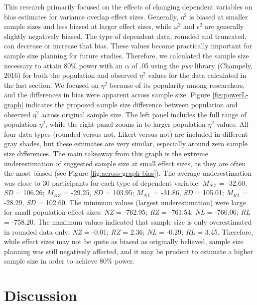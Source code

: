\documentclass[english,man]{apa6}
\theoremstyle{definition}
\theoremstyle{definition}
\theoremstyle{definition}
\theoremstyle{remark}
\begin{document}
This research primarily focused on the effects of changing dependent
variables on bias estimates for variance overlap effect sizes.
Generally, \(\eta^2\) is biased at smaller sample sizes and less biased
at larger effect sizes, while \(\omega^2\) and \(\epsilon^2\) are
generally slightly negatively biased. The type of dependent data,
rounded and truncated, can decrease or increase that bias. These values
become practically important for sample size planning for future
studies. Therefore, we calculated the sample size necessary to attain
80\% power with an \(\alpha\) of .05 using the \emph{pwr} library
(Champely, 2016) for both the population and observed \(\eta^2\) values
for the data calculated in the last section. We focused on \(\eta^2\)
because of its popularity among researchers, and the differences in bias
were apparent across sample size. Figure \ref{fig:powerL-graph}
indicates the proposed sample size difference between population and
observed \(\eta^2\) across original sample size. The left panel includes
the full range of population \(\eta^2\), while the right panel zooms in
to larger population \(\eta^2\) values. All four data types (rounded
versus not, Likert versus not) are included in different gray shades,
but these estimates are very similar, especially around zero sample size
differences. The main takeaway from this graph is the extreme
underestimation of suggested sample size at small effect sizes, as they
are often the most biased (see Figure \ref{fig:across-graph-bias}). The
average underestimation was close to 30 participants for each type of
dependent variable: \(M_{NZ}\) = -32.60, \emph{SD} = 106.26; \(M_{RZ}\)
= -29.25, \emph{SD} = 103.95; \(M_{NL}\) = -31.86, \emph{SD} = 105.01;
\(M_{RL}\) = -28.29, \emph{SD} = 102.60. The minimum values (largest
underestimation) were large for small population effect sizes: \emph{NZ}
= -762.95; \emph{RZ} = -761.54; \emph{NL} = -760.06; \emph{RL} =
-758.20. The maximum values indicated that sample size is only
overestimated in rounded data only: \emph{NZ} = -0.01; \emph{RZ} = 2.36;
\emph{NL} = -0.29; \emph{RL} = 3.45. Therefore, while effect sizes may
not be quite as biased as originally believed, sample size planning was
still negatively affected, and it may be prudent to estimate a higher
sample size in order to achieve 80\% power.

\section{Discussion}\label{discussion}
\end{document}
